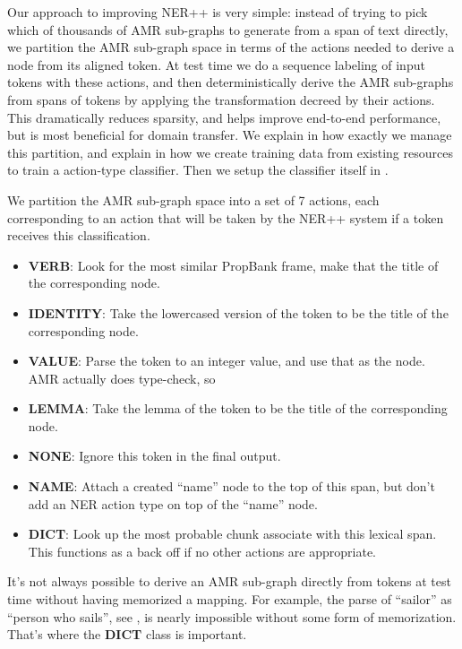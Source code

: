 \documentclass[11pt]{article}
\begin{document}
Our approach to improving NER++ is very simple: instead of trying to pick which of thousands of AMR sub-graphs to generate from a span of text directly, we partition the AMR sub-graph space in terms of the actions needed to derive a node from its aligned token. At test time we do a sequence labeling of input tokens with these actions, and then deterministically derive the AMR sub-graphs from spans of tokens by applying the transformation decreed by their actions. This dramatically reduces sparsity, and helps improve end-to-end performance, but is most beneficial for domain transfer. We explain in  how exactly we manage this partition, and explain in  how we create training data from existing resources to train a action-type classifier. Then we setup the classifier itself in .


We partition the AMR sub-graph space into a set of 7 actions, each corresponding to an action that will be taken by the NER++ system if a token receives this classification.

\begin{itemize}
\item \textbf{VERB}: Look for the most similar PropBank frame, make that the title of the corresponding node.
\item \textbf{IDENTITY}: Take the lowercased version of the token to be the title of the corresponding node.
\item \textbf{VALUE}: Parse the token to an integer value, and use that as the node. AMR actually does type-check, so 
\item \textbf{LEMMA}: Take the lemma of the token to be the title of the corresponding node.
\item \textbf{NONE}: Ignore this token in the final output.
\item \textbf{NAME}: Attach a created ``name'' node to the top of this span, but don't add an NER action type on top of the ``name'' node.
\item \textbf{DICT}: Look up the most probable chunk associate with this lexical span. This functions as a back off if no other actions are appropriate.
\end{itemize}


It's not always possible to derive an AMR sub-graph directly from tokens at test time without having memorized a mapping. For example, the parse of ``sailor'' as ``person who sails'', see , is nearly impossible without some form of memorization. That's where the \textbf{DICT} class is important.
\end{document}
